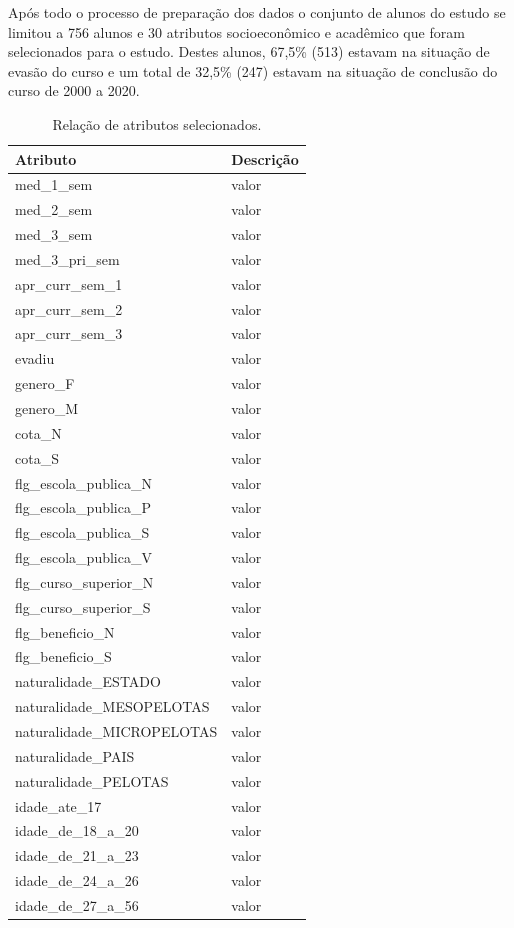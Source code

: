 \documentclass[diss,capa]{texufpel}
\begin{document}
Após todo o processo de preparação dos dados o conjunto de alunos do estudo se limitou a 756 alunos e 30 atributos socioeconômico e acadêmico que foram selecionados para o estudo.
Destes alunos, 67,5\% (513) estavam na situação de evasão do curso e um total de 32,5\% (247) estavam na situação de conclusão do curso de 2000 a 2020.

\begin{table}[htbp]
\footnotesize\addtolength{\tabcolsep}{-3pt}
\begin{center}
\caption{Relação de atributos selecionados.}\label{alunos-atributos}
\begin{tabular}{l|l}
\hline
Atributo             & Descrição                                \\
\hline
med\_1\_sem & valor \\
med\_2\_sem & valor \\
med\_3\_sem & valor \\
med\_3\_pri\_sem & valor \\
apr\_curr\_sem\_1 & valor \\

apr\_curr\_sem\_2 & valor \\
apr\_curr\_sem\_3 & valor \\
evadiu & valor \\
genero\_F & valor \\
genero\_M & valor \\

cota\_N & valor \\
cota\_S & valor \\
flg\_escola\_publica\_N & valor \\
flg\_escola\_publica\_P & valor \\
flg\_escola\_publica\_S & valor \\

flg\_escola\_publica\_V & valor \\
flg\_curso\_superior\_N & valor \\
flg\_curso\_superior\_S & valor \\
flg\_beneficio\_N & valor \\
flg\_beneficio\_S & valor \\

naturalidade\_ESTADO & valor \\
naturalidade\_MESOPELOTAS & valor \\
naturalidade\_MICROPELOTAS & valor \\
naturalidade\_PAIS & valor \\
naturalidade\_PELOTAS & valor \\

idade\_ate\_17 & valor \\
idade\_de\_18\_a\_20 & valor \\
idade\_de\_21\_a\_23 & valor \\
idade\_de\_24\_a\_26 & valor \\
idade\_de\_27\_a\_56 & valor \\
\hline
\end{tabular}
\end{center}
\end{table}
\end{document}
